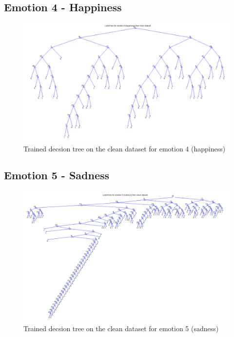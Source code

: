 \documentclass[a4paper]{article}
\begin{document}
\subsection{Emotion 4 - Happiness}
\begin{figure}[H]
\center
\includegraphics[width=0.9\columnwidth]{HappinessTree} %
\caption{Trained decsion tree on the clean dataset for emotion 4 (happiness)}
\end{figure}

\subsection{Emotion 5 - Sadness}
\begin{figure}[H]
\center
\includegraphics[width=0.9\columnwidth]{SadnessTree} %
\caption{Trained decsion tree on the clean dataset for emotion 5 (sadness)}
\end{figure}

\bigskip\bigskip\bigskip\bigskip\bigskip\bigskip
\end{document}
